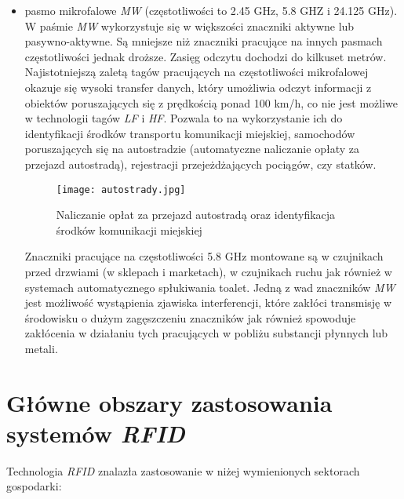 \begin{itemize}
	\item pasmo mikrofalowe \emph{MW} (częstotliwości to 2.45 GHz, 5.8 GHZ i 24.125 GHz).
W paśmie \emph{MW} wykorzystuje się w większości znaczniki aktywne lub pasywno-aktywne. Są  mniejsze niż znaczniki pracujące na innych pasmach częstotliwości jednak droższe. Zasięg odczytu dochodzi do kilkuset metrów. Najistotniejszą zaletą tagów pracujących na częstotliwości mikrofalowej okazuje się wysoki transfer danych, który  umożliwia odczyt informacji z obiektów poruszających się z prędkością ponad 100 km/h, co nie jest możliwe w technologii tagów \emph{LF} i \emph{HF}. Pozwala to na wykorzystanie ich do identyfikacji środków transportu komunikacji miejskiej, samochodów poruszających się  na autostradzie (automatyczne naliczanie opłaty za przejazd autostradą), rejestracji przejeżdżających pociągów, czy statków.

	\begin{figure}[h!]
	\centering
	    \texttt{[image: autostrady.jpg]}
	    \caption{Naliczanie opłat za przejazd autostradą oraz identyfikacja środków komunikacji miejskiej}
	\end{figure}

	Znaczniki pracujące na częstotliwości 5.8 GHz montowane są w czujnikach przed drzwiami (w sklepach i marketach), w czujnikach ruchu jak również w systemach automatycznego spłukiwania toalet.
	Jedną z wad znaczników \emph{MW} jest możliwość wystąpienia zjawiska interferencji, które zakłóci  transmisję w środowisku o dużym zagęszczeniu znaczników jak również spowoduje zakłócenia w działaniu tych pracujących  w pobliżu substancji płynnych lub metali.

\end{itemize}

\newpage

\section{Główne obszary zastosowania systemów \emph{RFID}}

\noindent 
Technologia \emph{RFID} znalazła zastosowanie w niżej wymienionych sektorach gospodarki: 

